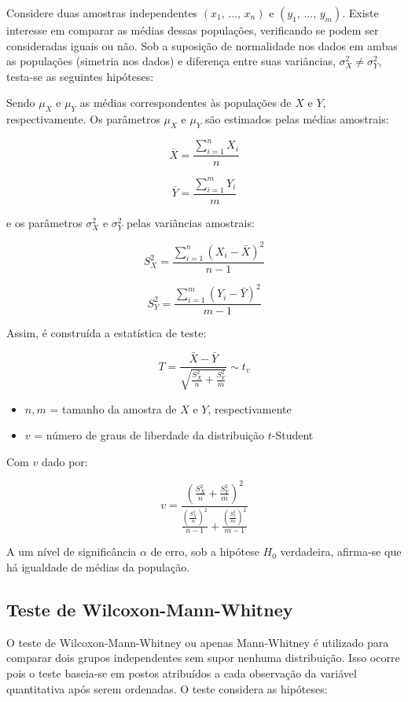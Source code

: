 \documentclass[
  portuguese,
]{estat/estat}
\providecommand{\tightlist}{%
  \setlength{\itemsep}{0pt}\setlength{\parskip}{0pt}}
\begin{document}
Considere duas amostras independentes \((x_1,\, \ldots , \, x_n)\) e
\((y_1,\, \ldots , \, y_m)\). Existe interesse em comparar as médias
dessas populações, verificando se podem ser consideradas iguais ou não.
Sob a suposição de normalidade nos dados em ambas as populações
(simetria nos dados) e diferença entre suas variâncias,
\(\sigma_X^2 \neq \sigma_Y^2\), testa-se as seguintes hipóteses:


Sendo \(\mu_X\) e \(\mu_Y\) as médias correspondentes às populações de
\(X\) e \(Y\), respectivamente. Os parâmetros \(\mu_X\) e \(\mu_Y\) são
estimados pelas médias amostrais:

\[
\bar{X} = \frac{\sum_{i=1}^{n} X_i}{n}
\]

\[
\bar{Y} = \frac{\sum_{i=1}^{m} Y_i}{m}
\]

e os parâmetros \(\sigma_X^2\) e \(\sigma_Y^2\) pelas variâncias
amostrais:

\[
S_X^2 = \frac{\sum_{i=1}^{n}(X_i - \bar{X})^2}{n - 1}
\]

\[
S_Y^2 = \frac{\sum_{i=1}^{m}(Y_i - \bar{Y})^2}{m - 1}
\]

Assim, é construída a estatística de teste:

\[
T = \frac{\bar{X} - \bar{Y}}{\sqrt{\frac{S_X^2}{n} + \frac{S_Y^2}{m}}} \sim t_v
\]

\begin{itemize}
\tightlist
\item
  \(n, m\) = tamanho da amostra de \(X\) e \(Y\), respectivamente
\item
  \(v\) = número de graus de liberdade da distribuição \(t\)-Student
\end{itemize}

Com \(v\) dado por:

\[
v = \frac{\left(\frac{S_X^2}{n} + \frac{S_Y^2}{m}\right)^2}{\frac{\left(\frac{S_X^2}{n}\right)^2}{n - 1} + \frac{\left(\frac{S_Y^2}{m}\right)^2}{m - 1}}
\]

A um nível de significância \(\alpha\) de erro, sob a hipótese \(H_{0}\)
verdadeira, afirma-se que há igualdade de médias da população.

\subsection{Teste de
Wilcoxon-Mann-Whitney}\label{teste-de-wilcoxon-mann-whitney}

O teste de Wilcoxon-Mann-Whitney ou apenas Mann-Whitney é utilizado para comparar dois grupos independentes sem supor nenhuma distribuição. Isso ocorre pois o teste baseia-se em postos atribuídos a cada observação da variável quantitativa após serem ordenadas. O teste considera as hipóteses:
\end{document}
